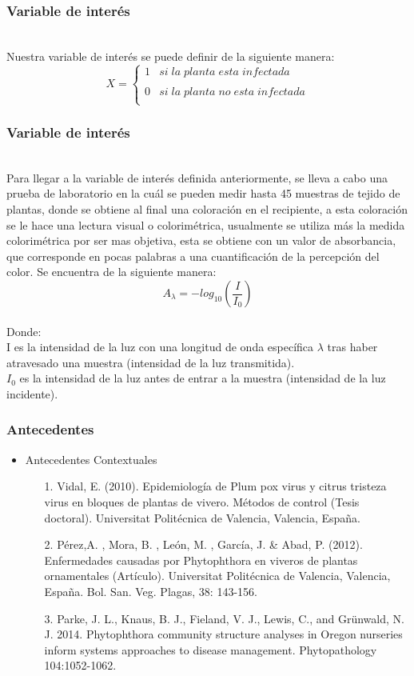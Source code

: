 \documentclass[11pt]{beamer}
\begin{document}
\begin{frame}
\frametitle{Variable de interés}
~\\Nuestra variable de interés se puede definir de la siguiente manera:
$$X= \left\{\begin{array}{cc}
             1 &   si \; la \; planta \; esta \; infectada \\
             \\ 0 &  si \; la \; planta \; no \; esta \; infectada \\
             \end{array}
   \right.$$
\end{frame}


\begin{frame}
\frametitle{Variable de interés}
~\\Para llegar a la variable de interés definida anteriormente, se lleva a cabo una prueba de laboratorio en la cuál se pueden medir hasta 45 muestras de tejido de plantas, donde se obtiene al final una coloración en el recipiente, a esta coloración se le hace una lectura visual o colorimétrica, usualmente se utiliza más la medida colorimétrica por ser mas objetiva, esta se obtiene con un valor de absorbancia, que corresponde en pocas palabras a una cuantificación de la percepción del color. Se encuentra de la siguiente manera:
\[ A_\lambda=-log_{10} \left( \frac{I}{I_0}\right) \]
~\\Donde:
~\\I es la intensidad de la luz con una longitud de onda específica $\lambda$ tras haber atravesado una muestra (intensidad de la luz transmitida).
~\\$I_0$  es la intensidad de la luz antes de entrar a la muestra (intensidad de la luz incidente).
\end{frame}

\begin{frame}
\frametitle{Antecedentes}
\begin{itemize}
\item Antecedentes Contextuales
\begin{itemize}
\item[1.]Vidal, E. (2010). Epidemiología de Plum pox virus y citrus tristeza virus en bloques de plantas de vivero. Métodos de control (Tesis doctoral). Universitat Politécnica de Valencia, Valencia, España.
\item[2.]Pérez,A. , Mora, B. , León, M. , García, J. \& Abad, P. (2012). Enfermedades causadas por Phytophthora en viveros de plantas ornamentales (Artículo). Universitat Politécnica de Valencia, Valencia, España. Bol. San. Veg. Plagas, 38: 143-156.
\item[3.]Parke, J. L., Knaus, B. J., Fieland, V. J., Lewis, C., and Grünwald, N. J.
2014. Phytophthora community structure analyses in Oregon nurseries
inform systems approaches to disease management. Phytopathology
104:1052-1062.
\end{itemize}
\end{itemize}
\end{frame}
\end{document}
